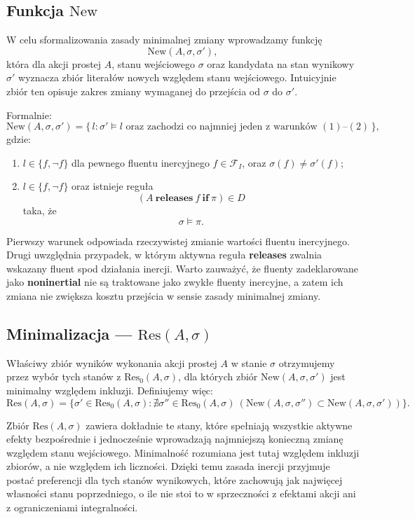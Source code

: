 \documentclass[11pt,a4paper]{article}
\theoremstyle{definition}
\begin{document}
\subsection{Funkcja \texorpdfstring{$\mathrm{New}$}{New}}
\label{sec:new}

W celu sformalizowania zasady minimalnej zmiany wprowadzamy funkcję
\[
\mathrm{New}(A,\sigma,\sigma'),
\]
która dla akcji prostej $A$, stanu wejściowego $\sigma$ oraz kandydata na stan wynikowy $\sigma'$ wyznacza zbiór literałów nowych względem stanu wejściowego. Intuicyjnie zbiór ten opisuje zakres zmiany wymaganej do przejścia od $\sigma$ do $\sigma'$.

Formalnie:
\[
\mathrm{New}(A,\sigma,\sigma')=
\{\, l : \sigma' \models l \text{ oraz zachodzi co najmniej jeden z warunków } (1)\text{--}(2)\,\},
\]
gdzie:
\begin{enumerate}
    \item $l \in \{f, \neg f\}$ dla pewnego fluentu inercyjnego $f \in \mathcal{F}_I$, oraz $\sigma(f)\neq \sigma'(f)$;
    \item $l \in \{f, \neg f\}$ oraz istnieje reguła
    \[
    (A\ \textbf{releases}\ f\ \textbf{if}\ \pi)\in D
    \]
    taka, że
    \[
    \sigma \models \pi.
    \]
\end{enumerate}

Pierwszy warunek odpowiada rzeczywistej zmianie wartości fluentu inercyjnego. Drugi uwzględnia przypadek, w którym aktywna reguła \textbf{releases} zwalnia wskazany fluent spod działania inercji. Warto zauważyć, że fluenty zadeklarowane jako \textbf{noninertial} nie są traktowane jako zwykłe fluenty inercyjne, a zatem ich zmiana nie zwiększa kosztu przejścia w sensie zasady minimalnej zmiany.

\subsection{Minimalizacja --- \texorpdfstring{$\mathrm{Res}(A, \sigma)$}{Res(A,sigma)}}
\label{sec:minimalizacja}

Właściwy zbiór wyników wykonania akcji prostej $A$ w stanie $\sigma$ otrzymujemy przez wybór tych stanów z $\mathrm{Res}_0(A,\sigma)$, dla których zbiór $\mathrm{New}(A,\sigma,\sigma')$ jest minimalny względem inkluzji. Definiujemy więc:
\[
\mathrm{Res}(A,\sigma)=
\{\sigma' \in \mathrm{Res}_0(A,\sigma) :
\nexists \sigma'' \in \mathrm{Res}_0(A,\sigma)\ 
(\mathrm{New}(A,\sigma,\sigma'') \subset \mathrm{New}(A,\sigma,\sigma'))\}.
\]

Zbiór $\mathrm{Res}(A,\sigma)$ zawiera dokładnie te stany, które spełniają wszystkie aktywne efekty bezpośrednie i jednocześnie wprowadzają najmniejszą konieczną zmianę względem stanu wejściowego. Minimalność rozumiana jest tutaj względem inkluzji zbiorów, a nie względem ich liczności. Dzięki temu zasada inercji przyjmuje postać preferencji dla tych stanów wynikowych, które zachowują jak najwięcej własności stanu poprzedniego, o ile nie stoi to w sprzeczności z efektami akcji ani z ograniczeniami integralności.
\end{document}
